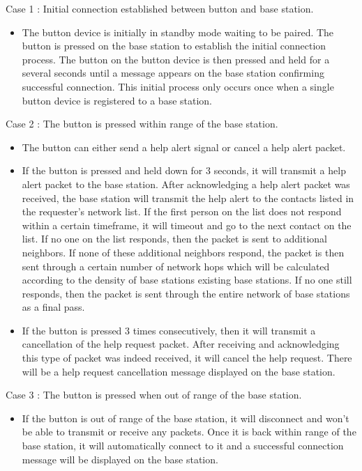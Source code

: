 \documentclass[journal,compsoc]{IEEEtran}
\begin{document}
\begin{LaTeXdescription}
\item[Case 1]: Initial connection established between button and base station.
  \begin{itemize}
    \item The button device is initially in standby mode waiting to be paired.  The button is pressed on the base station to establish the initial connection process.  The button on the button device is then pressed and held for a several seconds until a message appears on the base station confirming successful connection.  This initial process only occurs once when a single button device is registered to a base station.
  \end{itemize}
\item[Case 2]: The button is pressed within range of the base station.
  \begin{itemize}
    \item The button can either send a help alert signal or cancel a help alert packet.
    \item If the button is pressed and held down for 3 seconds, it will transmit a help alert packet to the base station.  After acknowledging a help alert packet was received, the base station will transmit the help alert to the contacts listed in the requester’s network list.  If the first person on the list does not respond within a certain timeframe, it will timeout and go to the next contact on the list.  If no one on the list responds, then the packet is sent to additional neighbors.  If none of these additional neighbors respond, the packet is then sent through a certain number of network hops which will be calculated according to the density of base stations existing base stations.  If no one still responds, then the packet is sent through the entire network of base stations as a final pass.
    \item If the button is pressed 3 times consecutively, then it will transmit a cancellation of the help request packet.  After receiving and acknowledging this type of packet was indeed received, it will cancel the help request.  There will be a help request cancellation message displayed on the base station.
  \end{itemize}
\item[Case 3]: The button is pressed when out of range of the base station.
  \begin{itemize}
    \item If the button is out of range of the base station, it will disconnect and won’t be able to transmit or receive any packets.  Once it is back within range of the base station, it will automatically connect to it and a successful connection message will be displayed on the base station.

\end{itemize}
\end{LaTeXdescription}
\end{document}
